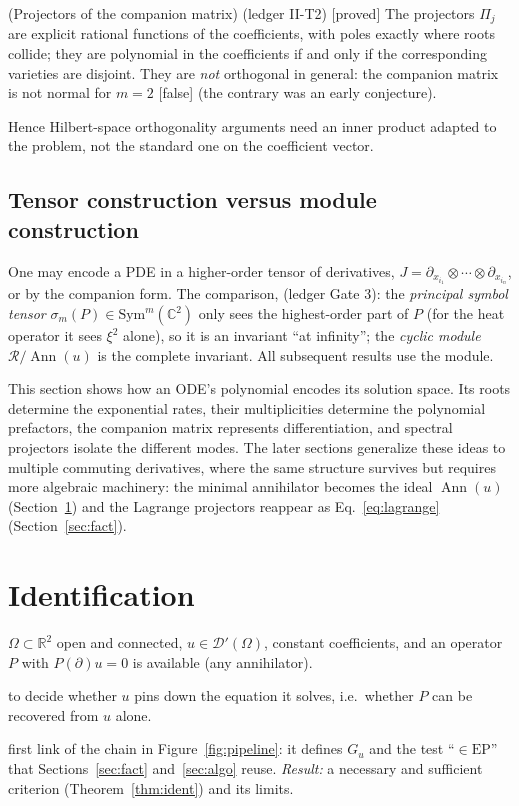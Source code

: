 \documentclass[11pt,a4paper]{article}
\theoremstyle{definition}
\newcommand{\badge}[2]{\textcolor{#1}{\textsf{\footnotesize[#2]}}}
\newcommand{\proved}[1][]{\badge{cC}{proved#1}}
\newcommand{\falsest}{\badge{cB}{false}}
\newcommand{\led}[1]{\textcolor{cG}{\textsf{\footnotesize(ledger #1)}}}
\newcommand{\sectionbrief}[3]{\begin{leadin}\begin{description}[nosep,leftmargin=3.0cm,labelwidth=2.8cm]
  \item[Starting from] #1
  \item[Why this section] #2
  \item[Role in the paper] #3
  \end{description}\end{leadin}}
\newcommand{\R}{\mathbb{R}}\newcommand{\C}{\mathbb{C}}\newcommand{\N}{\mathbb{N}}\newcommand{\Z}{\mathbb{Z}}
\newcommand{\Ann}{\operatorname{Ann}}
\newcommand{\EP}{\mathrm{EP}}
\newcommand{\ring}{\mathcal{R}}
\begin{document}
\begin{proposition}{(Projectors of the companion matrix) \led{II-T2} \proved[]}
The projectors $\Pi_j$ are explicit rational functions of the coefficients, with poles exactly where roots collide; they are polynomial in the coefficients if and only if the corresponding varieties are disjoint. They are \emph{not} orthogonal in general: the companion matrix is not normal for $m=2$ \falsest{} (the contrary was an early conjecture).
\end{proposition}
Hence Hilbert-space orthogonality arguments need an inner product adapted to the problem, not the standard one on the coefficient vector.

\subsection{Tensor construction versus module construction}
One may encode a PDE in a higher-order tensor of derivatives, $J=\partial_{x_{i_1}}\otimes\cdots\otimes\partial_{x_{i_n}}$, or by the companion form. The comparison, \led{Gate 3}: the \emph{principal symbol tensor} $\sigma_m(P)\in\mathrm{Sym}^m(\C^2)$ only sees the highest-order part of $P$ (for the heat operator it sees $\xi^2$ alone), so it is an invariant ``at infinity''; the \emph{cyclic module} $\ring/\Ann(u)$ is the complete invariant. All subsequent results use the module.



\begin{keypoint}
This section shows how an ODE's polynomial encodes its solution space. Its roots determine the exponential rates, their multiplicities determine the polynomial prefactors, the companion matrix represents differentiation, and spectral projectors isolate the different modes. The later sections generalize these ideas to multiple commuting derivatives, where the same structure survives but requires more algebraic machinery: the minimal annihilator becomes the ideal $\Ann(u)$ (Section~\ref{sec:ident}) and the Lagrange projectors reappear as Eq.~\eqref{eq:lagrange} (Section~\ref{sec:fact}).
\end{keypoint}

\section{Identification}\label{sec:ident}
\sectionbrief
{$\Omega\subset\R^2$ open and connected, $u\in\mathcal D'(\Omega)$, constant coefficients, and an operator $P$ with $P(\partial)u=0$ is available (any annihilator).}
{to decide whether $u$ pins down the equation it solves, i.e.\ whether $P$ can be recovered from $u$ alone.}
{first link of the chain in Figure~\ref{fig:pipeline}: it defines $G_u$ and the test ``$\in\EP$'' that Sections~\ref{sec:fact} and~\ref{sec:algo} reuse. \emph{Result:} a necessary and sufficient criterion (Theorem~\ref{thm:ident}) and its limits.}
\end{document}

